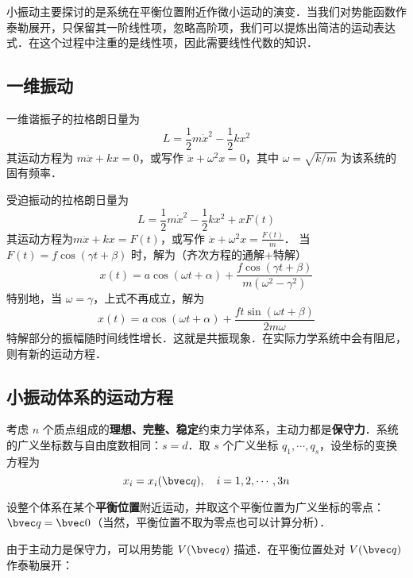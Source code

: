 

小振动主要探讨的是系统在平衡位置附近作微小运动的演变．当我们对势能函数作泰勒展开，只保留其一阶线性项，忽略高阶项，我们可以提炼出简洁的运动表达式．在这个过程中注重的是线性项，因此需要线性代数的知识．

\subsection{一维振动}
一维谐振子的拉格朗日量为
\begin{equation}
L=\frac{1}{2}m\dot{x}^2-\frac{1}{2}kx^2
\end{equation}
其运动方程为 $m\ddot {x}+kx=0$，或写作 $\ddot{x}+\omega^2 x=0$，其中 $\omega=\sqrt{k/m}$ 为该系统的固有频率．

受迫振动的拉格朗日量为 
\begin{equation}
L=\frac{1}{2}m\dot{x}^2-\frac{1}{2}kx^2+xF(t)
\end{equation}
其运动方程为$m\ddot{x}+kx=F(t)$，或写作 $\ddot{x}+\omega^2 x=\frac{F(t)}{m}$．
当 $F(t)=f\cos(\gamma t+\beta)$ 时，解为（齐次方程的通解+特解）
\begin{equation}
x(t)=a\cos(\omega t+\alpha)+\frac{f\cos(\gamma t+\beta)}{m(\omega^2-\gamma^2)}
\end{equation}
特别地，当 $\omega=\gamma$，上式不再成立，解为
\begin{equation}
x(t)=a \cos(\omega t+\alpha)+\frac{ft \sin(\omega t+\beta)}{2m\omega}
\end{equation}
特解部分的振幅随时间线性增长．这就是共振现象．在实际力学系统中会有阻尼，则有新的运动方程．

\subsection{小振动体系的运动方程}
考虑 $n$ 个质点组成的\textbf{理想、完整、稳定}约束力学体系，主动力都是\textbf{保守力}．系统的广义坐标数与自由度数相同：$s=d$．取 $s$ 个广义坐标 $q_1,\cdots,q_s$，设坐标的变换方程为
\begin{equation}
x_i = x_i(\bvec q),\ \ \  i=1,2,\cdots,3n
\end{equation}

设整个体系在某个\textbf{平衡位置}附近运动，并取这个平衡位置为广义坐标的零点：$\bvec q=\bvec 0$（当然，平衡位置不取为零点也可以计算分析）．

由于主动力是保守力，可以用势能 $V(\bvec q)$ 描述．在平衡位置处对 $V(\bvec q)$ 作泰勒展开：

